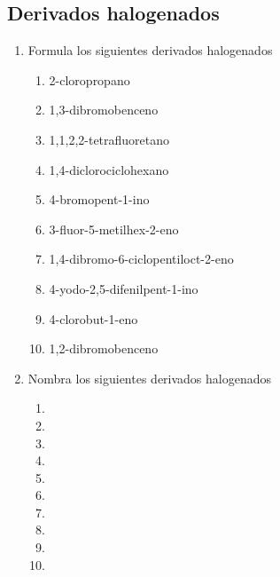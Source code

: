 \subsection{Derivados halogenados}
\begin{enumerate}
    \item Formula los siguientes derivados halogenados
          \begin{enumerate}
              \item 2-cloropropano
              \item 1,3-dibromobenceno
              \item 1,1,2,2-tetrafluoretano
              \item 1,4-diclorociclohexano
              \item 4-bromopent-1-ino
              \item 3-fluor-5-metilhex-2-eno
              \item 1,4-dibromo-6-ciclopentiloct-2-eno
              \item 4-yodo-2,5-difenilpent-1-ino
              \item 4-clorobut-1-eno
              \item 1,2-dibromobenceno
          \end{enumerate}
    \item Nombra los siguientes derivados halogenados
          \begin{enumerate}
              \item {}
              \item {}
              \item {}
              \item {}
              \item {}
              \item {}
              \item {}
              \item {}
              \item {}
              \item {}
          \end{enumerate}
\end{enumerate}
